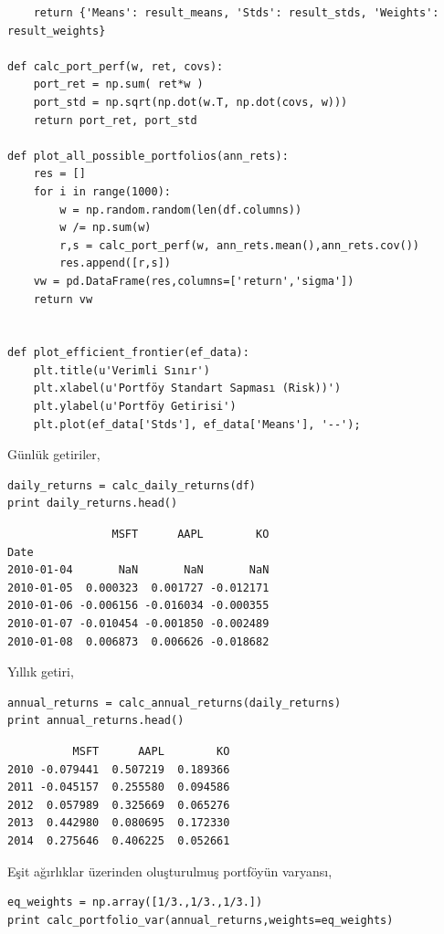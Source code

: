 \documentclass[12pt,fleqn]{article}\usepackage{../../common}
\begin{document}
\begin{verbatim}
    return {'Means': result_means, 'Stds': result_stds, 'Weights': result_weights}

def calc_port_perf(w, ret, covs):
    port_ret = np.sum( ret*w )
    port_std = np.sqrt(np.dot(w.T, np.dot(covs, w)))
    return port_ret, port_std

def plot_all_possible_portfolios(ann_rets):
    res = []
    for i in range(1000):
        w = np.random.random(len(df.columns))
        w /= np.sum(w)
        r,s = calc_port_perf(w, ann_rets.mean(),ann_rets.cov())
        res.append([r,s])
    vw = pd.DataFrame(res,columns=['return','sigma'])
    return vw
    
    
def plot_efficient_frontier(ef_data):
    plt.title(u'Verimli Sınır')
    plt.xlabel(u'Portföy Standart Sapması (Risk))')
    plt.ylabel(u'Portföy Getirisi')
    plt.plot(ef_data['Stds'], ef_data['Means'], '--');
\end{verbatim}

Günlük getiriler,

\begin{verbatim}
daily_returns = calc_daily_returns(df)
print daily_returns.head()
\end{verbatim}

\begin{verbatim}
                MSFT      AAPL        KO
Date                                    
2010-01-04       NaN       NaN       NaN
2010-01-05  0.000323  0.001727 -0.012171
2010-01-06 -0.006156 -0.016034 -0.000355
2010-01-07 -0.010454 -0.001850 -0.002489
2010-01-08  0.006873  0.006626 -0.018682
\end{verbatim}

Yıllık getiri,

\begin{verbatim}
annual_returns = calc_annual_returns(daily_returns)
print annual_returns.head()
\end{verbatim}

\begin{verbatim}
          MSFT      AAPL        KO
2010 -0.079441  0.507219  0.189366
2011 -0.045157  0.255580  0.094586
2012  0.057989  0.325669  0.065276
2013  0.442980  0.080695  0.172330
2014  0.275646  0.406225  0.052661
\end{verbatim}

Eşit ağırlıklar üzerinden oluşturulmuş portföyün varyansı,

\begin{verbatim}
eq_weights = np.array([1/3.,1/3.,1/3.])
print calc_portfolio_var(annual_returns,weights=eq_weights)
\end{verbatim}
\end{document}
